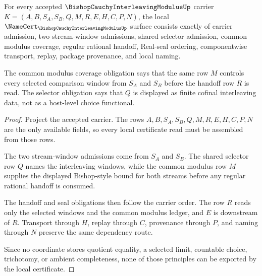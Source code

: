 \begin{theorem}
\label{thm:bishop-cauchy-interleaving-modulus-namecert-obligations}
For every accepted $\BishopCauchyInterleavingModulusUp$ carrier $K=(A,B,S_A,S_B,Q,M,R,E,H,C,P,N)$, the local $\NameCert_{\BishopCauchyInterleavingModulusUp}$ surface consists exactly of carrier admission, two stream-window admissions, shared selector admission, common modulus coverage, regular rational handoff, Real-seal ordering, componentwise transport, replay, package provenance, and local naming.

The common modulus coverage obligation says that the same row $M$ controls every selected comparison window from $S_A$ and $S_B$ before the handoff row $R$ is read. The selector obligation says that $Q$ is displayed as finite cofinal interleaving data, not as a host-level choice functional.
\end{theorem}
\begin{proof}
Project the accepted carrier. The rows $A,B,S_A,S_B,Q,M,R,E,H,C,P,N$ are the only available fields, so every local certificate read must be assembled from those rows.

The two stream-window admissions come from $S_A$ and $S_B$. The shared selector row $Q$ names the interleaving windows, while the common modulus row $M$ supplies the displayed Bishop-style bound for both streams before any regular rational handoff is consumed.

The handoff and seal obligations then follow the carrier order. The row $R$ reads only the selected windows and the common modulus ledger, and $E$ is downstream of $R$. Transport through $H$, replay through $C$, provenance through $P$, and naming through $N$ preserve the same dependency route.

Since no coordinate stores quotient equality, a selected limit, countable choice, trichotomy, or ambient completeness, none of those principles can be exported by the local certificate.
\end{proof}

